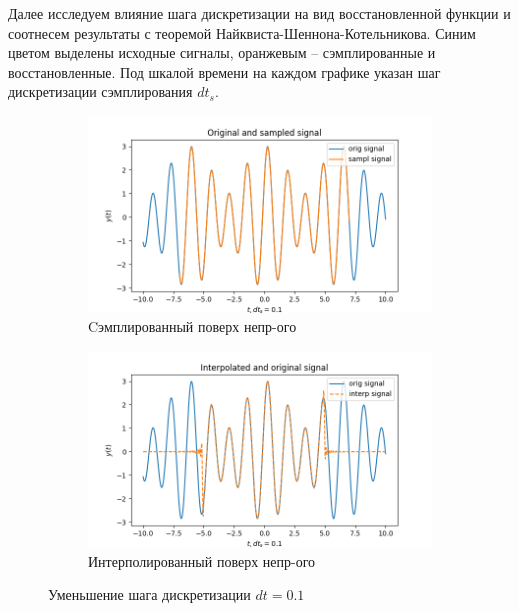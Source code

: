 \documentclass[a4paper, 12pt]{article}
\begin{document}
    Далее исследуем влияние шага дискретизации на вид восстановленной функции
    и соотнесем результаты с теоремой Найквиста-Шеннона-Котельникова. Синим цветом выделены исходные сигналы, оранжевым --
    сэмплированные и восстановленные. Под шкалой времени на каждом графике указан шаг дискретизации сэмплирования $dt_s$.
    \begin{figure}[H]
        \centering
        \begin{subfigure}{0.45\textwidth}
            \centering
            \includegraphics[width=\linewidth]{2_sine.png}
            \caption{Cэмплированный поверх непр-ого}
            \label{fig:2sine}
        \end{subfigure}
        \hspace{5mm}
        \begin{subfigure}{0.45\textwidth}
            \centering
            \includegraphics[width=\linewidth]{2_isine.png}
            \caption{Интерполированный поверх непр-ого}
            \label{fig:2isine}
        \end{subfigure}
        \caption{Уменьшение шага дискретизации $dt=0.1$}
        \label{fig:sines2}
    \end{figure}
\end{document}
